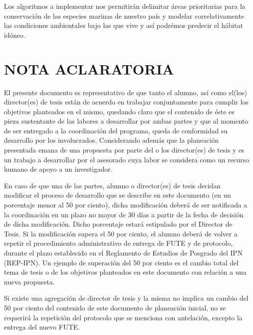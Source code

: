 \documentclass[runningheads,a4paper]{llncs}
\begin{document}
Los algoritmos a implementar nos permitirán delimitar áreas prioritarias para la
conservación de las especies marinas de nuestro país y modelar correlativamente
las condiciones ambientales bajo las que vive y así podrémos predecir el hábitat
idóneo.

\section{NOTA ACLARATORIA}
El presente documento es representativo de que tanto el alumno, así como el(los)
director(es) de tesis están de acuerdo en trabajar conjuntamente para cumplir
los objetivos planteados en el mismo, quedando claro que el contenido de éste es
pieza sustentante de las labores a desarrollar por ambas partes y que al momento
de ser entregado a la coordinación del programa, queda de conformidad su
desarrollo por los involucrados. Considerando además que la planeación
presentada emana de una propuesta por parte del o los director(es) de tesis y es
un trabajo a desarrollar por el asesorado cuya labor se considera como un
recurso humano de apoyo a un investigador.

En caso de que una de las partes, alumno o director(es) de tesis decidan
modificar el proceso de desarrollo que se describe en este documento (en un
porcentaje menor al 50 por ciento), dicha modificación deberá de ser notificada
a la coordinación en un plazo no mayor de 30 días a partir de la fecha de
decisión de dicha modificación. Dicho porcentaje estará estipulado por el
Director de Tesis. Si la modificación supera el 50 por ciento, el alumno deberá
de volver a repetir el procedimiento administrativo de entrega de FUTE y de
protocolo, durante el plazo establecido en el Reglamento de Estudios de Posgrado
del IPN (REP-IPN). Un ejemplo de superación del 50 por ciento es el cambio total
del tema de tesis o de los objetivos planteados en este documento con relación a
una nueva propuesta.

Si existe una agregación de director de tesis y la misma no implica un cambio
del 50 por ciento del contenido de este documento de planeación inicial, no se
requerirá la repetición del protocolo que se menciona con antelación, excepto la
entrega del nuevo FUTE.
\end{document}
